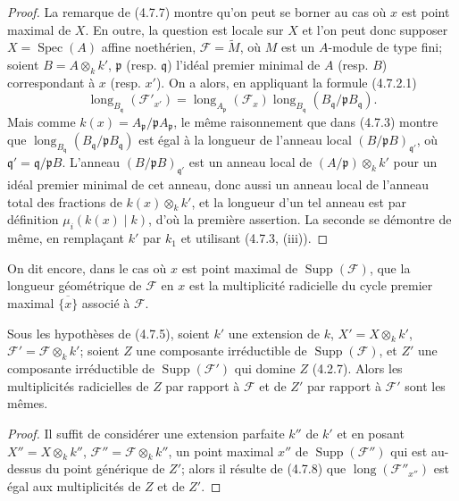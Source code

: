 \begin{proof}
La remarque de (4.7.7) montre qu'on peut se borner au cas où $x$ est point
maximal de $X$. En outre, la question est locale sur $X$ et l'on peut donc
supposer $X=\operatorname{Spec}(A)$ affine noethérien,
$\mathscr F=\widetilde M$, où $M$ est un $A$-module de type fini; soient
$B=A\otimes_k k'$, $\mathfrak p$ (resp. $\mathfrak q$) l'idéal premier
minimal de $A$ (resp. $B$) correspondant à $x$ (resp. $x'$). On a alors, en
appliquant la formule (4.7.2.1)
\[
\operatorname{long}_{B_{\mathfrak q}}(\mathscr F'_{x'})
=\operatorname{long}_{A_{\mathfrak p}}(\mathscr F_x)
 \operatorname{long}_{B_{\mathfrak q}}
 (B_{\mathfrak q}/\mathfrak pB_{\mathfrak q}).
\]
Mais comme $k(x)=A_{\mathfrak p}/\mathfrak pA_{\mathfrak p}$, le même
raisonnement que dans (4.7.3) montre que
$\operatorname{long}_{B_{\mathfrak q}}
(B_{\mathfrak q}/\mathfrak pB_{\mathfrak q})$ est égal à la longueur de
l'anneau local $(B/\mathfrak pB)_{\mathfrak q'}$, où
$\mathfrak q'=\mathfrak q/\mathfrak pB$. L'anneau
$(B/\mathfrak pB)_{\mathfrak q'}$ est un anneau local de
$(A/\mathfrak p)\otimes_k k'$ pour un idéal premier minimal de cet anneau,
donc aussi un anneau local de l'anneau total des fractions de
$k(x)\otimes_k k'$, et la longueur d'un tel anneau est par définition
$\mu_i(k(x)\mid k)$, d'où la première assertion. La seconde se démontre de
même, en remplaçant $k'$ par $k_1$ et utilisant (4.7.3, (iii)).
\end{proof}

On dit encore, dans le cas où $x$ est point maximal de
$\operatorname{Supp}(\mathscr F)$, que la longueur géométrique de $\mathscr F$
en $x$ est la multiplicité radicielle du cycle premier maximal
$\overline{\{x\}}$ associé à $\mathscr F$.

\begin{corollary}[4.7.9]
\label{IV.2.4.7.9-fr}
Sous les hypothèses de (4.7.5), soient $k'$ une extension de $k$,
$X'=X\otimes_k k'$, $\mathscr F'=\mathscr F\otimes_k k'$; soient $Z$ une
composante irréductible de $\operatorname{Supp}(\mathscr F)$, et $Z'$ une
composante irréductible de $\operatorname{Supp}(\mathscr F')$ qui domine $Z$
(4.2.7). Alors les multiplicités radicielles de $Z$ par rapport à
$\mathscr F$ et de $Z'$ par rapport à $\mathscr F'$ sont les mêmes.
\end{corollary}


\begin{proof}
Il suffit de considérer une extension parfaite $k''$ de $k'$ et en posant
$X''=X\otimes_k k''$, $\mathscr F''=\mathscr F\otimes_k k''$, un point
maximal $x''$ de $\operatorname{Supp}(\mathscr F'')$ qui est au-dessus du
point générique de $Z'$; alors il résulte de (4.7.8) que
$\operatorname{long}(\mathscr F''_{x''})$ est égal aux multiplicités de $Z$ et
de $Z'$.
\end{proof}

